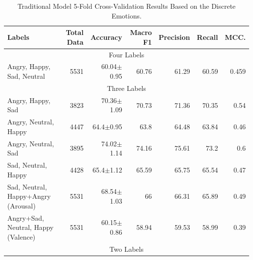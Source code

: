 \begin{table}[H]
\small
\centering
\caption{Traditional Model 5-Fold Cross-Validation Results Based on the Discrete Emotions.}
\label{tab:emo_cat}
    \centering
    \begin{tabular}{lrrrrrr}
    	\toprule
    	Labels                      &   Total Data & Accuracy    & Macro F1    & Precision   & Recall      & MCC.       \\
    	\midrule
 	    \multicolumn{7}{c}{Four Labels} \\
    	Angry, Happy, Sad, Neutral             &         5531 &  60.04$\pm$0.95 & 60.76 & 61.29 & 60.59 & 0.459 \\
    	\midrule
    	\multicolumn{7}{c}{Three Labels} \\
    	
		Angry, Happy, Sad                   &         3823 & 70.36$\pm$1.09 &      70.73 &       71.36 &    70.35 &   0.54 \\
		Angry, Neutral, Happy               &         4447 & 64.4$\pm$0.95  &      63.8  &       64.48 &    63.84 &   0.46 \\
		Angry, Neutral, Sad                 &         3895 & 74.02$\pm$1.14 &      74.16 &       75.61 &    73.2  &   0.6  \\
		Sad, Neutral, Happy                 &         4428 & 65.4$\pm$1.12  &      65.59 &       65.75 &    65.54 &   0.47 \\
		
		Sad, Neutral, Happy+Angry (Arousal) &         5531 & 68.54$\pm$1.03 &      66    &       66.31 &    65.89 &   0.49 \\
		Angry+Sad, Neutral, Happy (Valence) &         5531 & 60.15$\pm$0.86 &      58.94 &       59.53 &    58.99 &   0.39 \\
    	\midrule
    	\multicolumn{7}{c}{Two Labels} \\
    	    	

\end{tabular}
\end{table}
